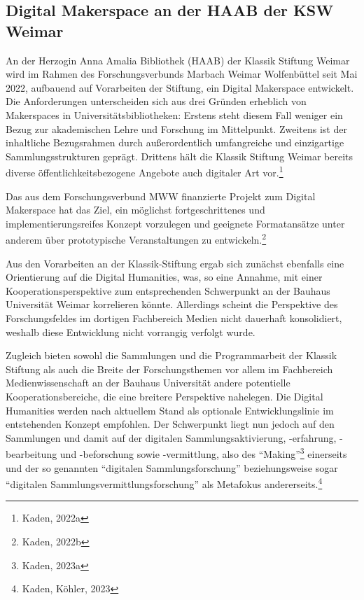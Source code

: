\documentclass[a4paper,
fontsize=11pt,
oneside,
numbers=noperiodatend,
parskip=half-,
bibliography=totoc,
final
]{scrartcl}
\begin{document}
\hypertarget{digital-makerspace-an-der-haab-der-ksw-weimar}{%
\subsection{Digital Makerspace an der HAAB der KSW
Weimar}\label{digital-makerspace-an-der-haab-der-ksw-weimar}}

An der Herzogin Anna Amalia Bibliothek (HAAB) der Klassik Stiftung
Weimar wird im Rahmen des Forschungsverbunds Marbach Weimar Wolfenbüttel
seit Mai 2022, aufbauend auf Vorarbeiten der Stiftung, ein Digital
Makerspace entwickelt. Die Anforderungen unterscheiden sich aus drei
Gründen erheblich von Makerspaces in Universitätsbibliotheken: Erstens
steht diesem Fall weniger ein Bezug zur akademischen Lehre und Forschung
im Mittelpunkt. Zweitens ist der inhaltliche Bezugsrahmen durch
außerordentlich umfangreiche und einzigartige Sammlungsstrukturen
geprägt. Drittens hält die Klassik Stiftung Weimar bereits diverse
öffentlichkeitsbezogene Angebote auch digitaler Art vor.\footnote{Kaden,
  2022a}

Das aus dem Forschungsverbund MWW finanzierte Projekt zum Digital
Makerspace hat das Ziel, ein möglichst fortgeschrittenes und
implementierungsreifes Konzept vorzulegen und geeignete Formatansätze
unter anderem über prototypische Veranstaltungen zu
entwickeln.\footnote{Kaden, 2022b}

Aus den Vorarbeiten an der Klassik-Stiftung ergab sich zunächst
ebenfalls eine Orientierung auf die Digital Humanities, was, so eine
Annahme, mit einer Kooperationsperspektive zum entsprechenden
Schwerpunkt an der Bauhaus Universität Weimar korrelieren könnte.
Allerdings scheint die Perspektive des Forschungsfeldes im dortigen
Fachbereich Medien nicht dauerhaft konsolidiert, weshalb diese
Entwicklung nicht vorrangig verfolgt wurde.

Zugleich bieten sowohl die Sammlungen und die Programmarbeit der Klassik
Stiftung als auch die Breite der Forschungsthemen vor allem im
Fachbereich Medienwissenschaft an der Bauhaus Universität andere
potentielle Kooperationsbereiche, die eine breitere Perspektive
nahelegen. Die Digital Humanities werden nach aktuellem Stand als
optionale Entwicklungslinie im entstehenden Konzept empfohlen. Der
Schwerpunkt liegt nun jedoch auf den Sammlungen und damit auf der
digitalen Sammlungsaktivierung, -erfahrung, -bearbeitung und
-beforschung sowie -vermittlung, also des \enquote{Making}\footnote{Kaden,
  2023a} einerseits und der so genannten \enquote{digitalen
Sammlungsforschung} beziehungsweise sogar \enquote{digitalen
Sammlungsvermittlungsforschung} als Metafokus andererseits.\footnote{Kaden,
  Köhler, 2023}
\end{document}
